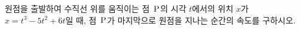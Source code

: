 원점을 출발하여 수직선 위를 움직이는 점~$\mathrm{P}$의 시각 $t$에서의 위치 $x$가 $x=t^3-5t^2+6t$일 때, 점~$\mathrm{P}$가 마지막으로 원점을 지나는 순간의 속도를 구하시오.

